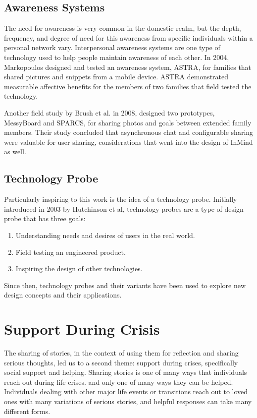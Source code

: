   \subsection{Awareness Systems}
    The need for awareness is very common in the domestic realm,
    but the depth, frequency, and degree of need for this awareness from specific individuals
    within a personal network vary.
    \cite{neustaedter06}
    Interpersonal awareness systems are one type of technology used to
    help people maintain awareness of each other.
    In 2004, Markopoulos designed and tested an
    awareness system, ASTRA, for families that shared pictures and snippets from a mobile
    device.
    \cite{markopoulos04}
    ASTRA demonstrated measurable affective benefits for the members of
    two families that field tested the technology.

    Another field study by Brush et al. in 2008,
    designed two prototypes, MessyBoard and SPARCS,
    for sharing photos and goals between extended family members.
    \cite{brush08}
    Their study concluded that asynchronous chat and configurable sharing were
    valuable for user sharing,
    considerations that went into the design of InMind as well.

  \subsection{Technology Probe}
    Particularly inspiring to this work is the idea of a technology probe.
    Initially introduced in 2003 by Hutchinson et al,
    technology probes are a type of design probe that has three goals:
    \begin{enumerate}
    \item Understanding needs and desires of users in the real world.
    \item Field testing an engineered product.
    \item Inspiring the design of other technologies.
    \end{enumerate}

    Since then, technology probes and their variants have been used to explore
    new design concepts and their applications. \cite{vetere05, lottridge09}

\section{Support During Crisis}
  The sharing of stories,
  in the context of using them for reflection and sharing serious thoughts,
  led us to a second theme:
  support during crises,
  specifically social support and helping.
  Sharing stories is one of many ways that
  individuals reach out during life crises.
  and only one of many ways they can be helped.
  Individuals dealing with other major life events or transitions
  reach out to loved ones with many variations of serious stories,
  and helpful responses can take many different forms.

